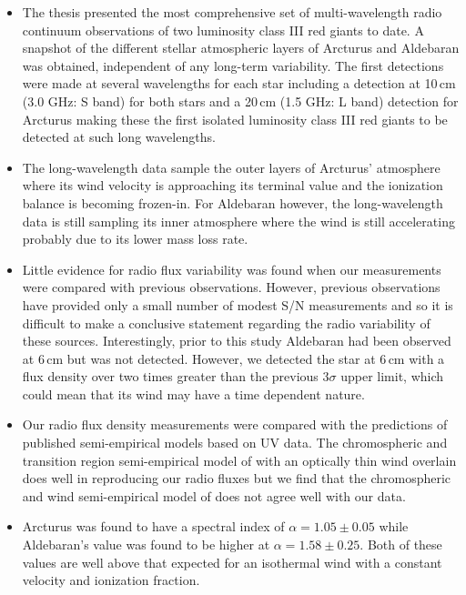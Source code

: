 \begin{itemize}
	\item The thesis presented the most comprehensive set of multi-wavelength radio continuum observations of two luminosity class III red giants to date. A snapshot of the different stellar atmospheric layers of Arcturus and Aldebaran was obtained, independent of any long-term variability. The first detections were made at several wavelengths for each star including a detection at 10\,cm (3.0 GHz: S band) for both stars and a 20\,cm (1.5 GHz: L band) detection for Arcturus making these the first isolated luminosity class III red giants to be detected at such long wavelengths.
  
	\item The long-wavelength data sample the outer layers of Arcturus' atmosphere where its wind velocity is approaching its terminal value and the ionization balance is becoming frozen-in. For Aldebaran however, the long-wavelength data is still sampling its inner atmosphere where the wind is still accelerating probably due to its lower mass loss rate. 

	\item Little evidence for radio flux variability was found when our measurements were compared with previous observations. However, previous observations have provided only a small number of modest S/N measurements and so it is difficult to make a conclusive statement regarding the radio variability of these sources. Interestingly, prior to this study Aldebaran had been observed at 6\,cm but was not detected. However, we detected the star at 6\,cm with a flux density over two times greater than the previous $3\sigma$ upper limit, which could mean that its wind may have a time dependent nature.
	  
	\item Our radio flux density measurements were compared with the predictions of published semi-empirical models based on UV data. The chromospheric and transition region semi-empirical model of \cite{mcmurry_1999} with an optically thin wind overlain does well in reproducing our radio fluxes but we find that the chromospheric and wind semi-empirical model of \cite{drake_1985} does not agree well with our data.
  
	\item Arcturus was found to have a spectral index of $\alpha = 1.05 \pm 0.05$ while Aldebaran's value was found to be higher at $\alpha = 1.58 \pm 0.25$. Both of these values are well above that expected for an isothermal wind with a constant velocity and ionization fraction.


\end{itemize}
